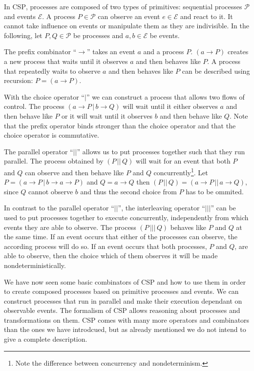 In \textsc{CSP}, processes are composed of two types of primitives: sequential processes $\mathcal{P}$ and events $\mathcal{E}$. A process $P \in \mathcal{P}$ can observe an event $e \in \mathcal{E}$ and react to it. It cannot take influence on events or manipulate them as they are indivisible. In the following, let $P, Q \in \mathcal{P}$ be processes and $a,b \in \mathcal{E}$ be events.

The prefix combinator \enquote{$\to$} takes an event $a$ and a process $P$. $\left( a \to P \right)$ creates a new process that waits until it observes $a$ and then behaves like $P$. A process that repeatedly waits to observe $a$ and then behaves like $P$ can be described using recursion: $P = \left( a \to P \right)$.

With the choice operator \enquote{$|$} we can construct a process that allows two flows of control. The process $\left( a \to P \,|\, b \to Q \right)$ will wait until it either observes $a$ and then behave like $P$ or it will wait until it observes $b$ and then behave like $Q$. Note that the prefix operator binds stronger than the choice operator and that the choice operator is commutative.

The parallel operator \enquote{$||$} allows us to put processes together such that they run parallel. The process obtained by $\left( P \,||\, Q \right)$ will wait for an event that both $P$ and $Q$ can observe and then behave like $P$ and $Q$ concurrently\footnote{Note the difference between concurrency and nondeterminism.}. Let $P = \left( a \to P \,|\, b \to a \to P \right)$ and $Q = a \to Q$ then $\left( P \,||\, Q \right) = \left( a \to P \,||\, a \to Q \right)$, since $Q$ cannot observe $b$ and thus the second choice from $P$ has to be ommited.

In contrast to the parallel operator \enquote{$||$}, the interleaving operator \enquote{$|||$} can be used to put processes together to execute concurrently, independently from which events they are able to observe. The process $\left( P \,|||\, Q \right)$ behaves like $P$ and $Q$ at the same time. If an event occurs that either of the processes can observe, the according process will do so. If an event occurs that both processes, $P$ and $Q$, are able to observe, then the choice which of them observes it will be made nondeterministically.

We have now seen some basic combinators of \textsc{CSP} and how to use them in order to create composed processes based on primitive processes and events. We can construct processes that run in parallel and make their execution dependant on observable events. The formalism of \textsc{CSP} allows reasoning about processes and transformations on them. \textsc{CSP} comes with many more operators and combinators than the ones we have introdcued, but as already mentioned we do not intend to give a complete description.

